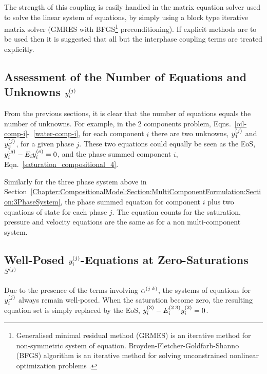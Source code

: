 The strength of this coupling is easily handled in the matrix equation solver used to solve the linear system of equations, by simply using a block type iterative matrix solver (\eg GMRES with BFGS\footnote{Generalised minimal residual method (GRMES) is an iterative method for non-symmetric system of equation. Broyden-Fletcher-Goldfarb-Shanno (BFGS) algorithm is an iterative method for solving unconstrained nonlinear optimization problems \citep[see][for full description of these methods]{Golub_Book,Bunch_Book,Xiao_2008}.} preconditioning). If explicit methods are to be used then it is suggested that all but the interphase coupling terms are treated explicitly. 

\subsection{Assessment of the Number of Equations and Unknowns $\mfr[y]{i}{j}$}\label{Chapter:CompositionalModel:Section:Assessment_Yij}
From the previous sections, it is clear that the number of equations equals the number of unknowns. For example, in the 2 components problem, Eqns.~\ref{oil-comp-i}-~\ref{water-comp-i}, for each component $i$ there are two unknowns, $\mfr[y]{1}{j}$ and $\mfr[y]{2}{j}$, for a given phase $j$. These two equations could equally be seen as the EoS, $\mfr[y]{i}{g} - E_{i} \mfr[y]{i}{o} = 0$, and the phase summed component $i$, Eqn.~\ref{saturation_compositional_4}. 

Similarly for the three phase system above in Section~\ref{Chapter:CompositionalModel:Section:MultiComponentFormulation:Section:3PhaseSystem}, the phase summed equation for component $i$ plus two equations of state for each phase $j$. The equation counts for the saturation, pressure and velocity equations are the same as for a non multi-component system. 

\subsection{Well-Posed $\mfr[y]{i}{j}$-Equations at Zero-Saturations $\mfr[S]{}{j}$}\label{Chapter:CompositionalModel:Section:ZeroSaturations} 
Due to the presence of the terms involving $\mfr[\alpha]{}{j\;k}$, the systems of equations for $\mfr[y]{i}{j}$ always remain well-posed. When the saturation become zero, the resulting equation set is simply replaced by the EoS, \eg $\mfr[y]{i}{3} - \mfr[E]{i}{2\;3}\mfr[y]{i}{2} = 0$.

